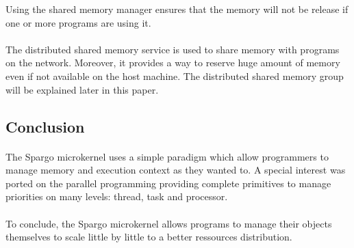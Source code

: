 \documentclass[10pt,a4wide]{article}
\begin{document}
\begin{multicols}{2}
Using the shared memory manager ensures that the memory will not be release
if one or more programs are using it.

\paragraph{}

The distributed shared memory service is used to share memory with
programs on the network. Moreover, it provides a way to reserve huge amount
of memory even if not available on the host machine. The distributed shared
memory group will be explained later in this paper.

\subsection{Conclusion}

\paragraph{}

The Spargo microkernel uses a simple paradigm which allow programmers to
manage memory and execution context as they wanted to. A special interest
was ported on the parallel programming providing complete primitives to
manage priorities on many levels: thread, task and processor.

\paragraph{}

To conclude, the Spargo microkernel allows programs to manage their objects
themselves to scale little by little to a better ressources distribution.

\end{multicols}
\end{document}
